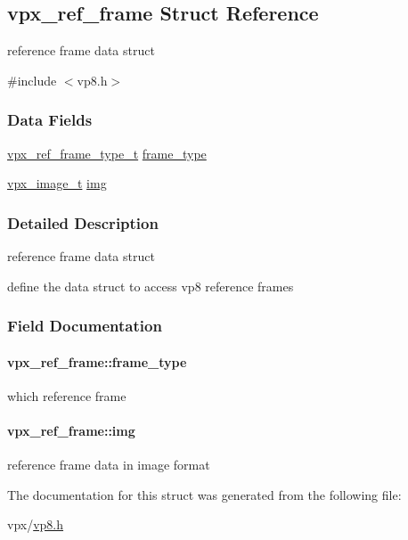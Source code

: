 \hypertarget{structvpx__ref__frame}{
\subsection{vpx\-\_\-ref\-\_\-frame \-Struct \-Reference}
\label{structvpx__ref__frame}
}


reference frame data struct  




{\ttfamily \#include $<$vp8.\-h$>$}

\subsubsection*{\-Data \-Fields}
\begin{DoxyCompactItemize}
\item 
\hyperlink{group__vp8_ga75ac0689a81bf7202382a225c5b451b4}{vpx\-\_\-ref\-\_\-frame\-\_\-type\-\_\-t} \hyperlink{structvpx__ref__frame_a7fbe51de592d0ff16d9fbd4d2b367c9b}{frame\-\_\-type}
\item 
\hyperlink{vpx__image_8h_abf5ac962cc6d71b4f0e39b1b0d033e55}{vpx\-\_\-image\-\_\-t} \hyperlink{structvpx__ref__frame_a972d24d0243f51f84eef7e1b79c6c414}{img}
\end{DoxyCompactItemize}


\subsubsection{\-Detailed \-Description}
reference frame data struct 

define the data struct to access vp8 reference frames 

\subsubsection{\-Field \-Documentation}
\hypertarget{structvpx__ref__frame_a7fbe51de592d0ff16d9fbd4d2b367c9b}{
\paragraph[{frame\-\_\-type}]{ {\bf vpx\-\_\-ref\-\_\-frame\-::frame\-\_\-type}}}
\label{structvpx__ref__frame_a7fbe51de592d0ff16d9fbd4d2b367c9b}
which reference frame \hypertarget{structvpx__ref__frame_a972d24d0243f51f84eef7e1b79c6c414}{
\paragraph[{img}]{ {\bf vpx\-\_\-ref\-\_\-frame\-::img}}}
\label{structvpx__ref__frame_a972d24d0243f51f84eef7e1b79c6c414}
reference frame data in image format 

\-The documentation for this struct was generated from the following file\-:\begin{DoxyCompactItemize}
\item 
vpx/\hyperlink{vp8_8h}{vp8.\-h}\end{DoxyCompactItemize}
